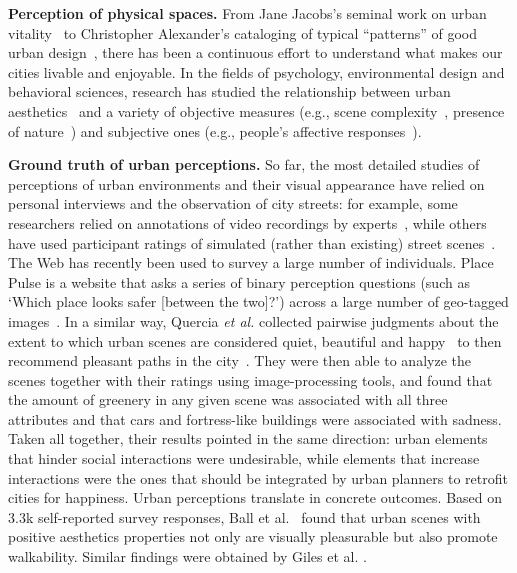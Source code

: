 \vspace{4pt}\noindent
\textbf{Perception of physical spaces.} From Jane Jacobs's seminal work on urban vitality~\cite{jacobs1961death} to Christopher Alexander's cataloging of typical ``patterns'' of good urban design~\cite{alexander1977pattern}, there has been a continuous effort to understand what makes our cities livable and enjoyable.  In the fields of psychology, environmental design and behavioral sciences, research has studied the relationship between urban aesthetics~\cite{real2000classification} and a variety of objective measures  (e.g.,  scene complexity~\cite{kaplan1972rated}, presence of nature~\cite{kaplan1989experience}) and subjective ones (e.g., people's affective responses~\cite{ulrich1983aesthetic}).  


\vspace{4pt}\noindent
\textbf{Ground truth of urban perceptions.} So far, the most detailed studies of perceptions of urban environments and their visual appearance have relied on personal interviews and the observation of city streets: for example, some researchers relied on annotations of video recordings by experts~\cite{sampson04seeing}, while others have used participant ratings of simulated (rather than existing) street scenes~\cite{lindal2012}. The Web has recently been used to survey a large number of individuals. Place Pulse is a website that asks a series of binary perception questions (such as `Which place looks safer [between the two]?') across a large number of geo-tagged images~\cite{salesses2013collaborative}. In a similar way, Quercia \emph{et al.} collected pairwise judgments about the extent to which urban scenes are considered quiet, beautiful and happy~\cite{quercia2014aesthetic} to then recommend pleasant paths in the city~\cite{quercia2014shortest}. They were then able to analyze the scenes together with their ratings using image-processing tools, and found that the amount of greenery in any given scene was associated with all three attributes and that cars and fortress-like buildings were associated with sadness. Taken all together, their results pointed in the same direction: urban elements that hinder social interactions were undesirable, while elements that increase interactions were the ones that should be integrated by urban planners to retrofit cities for happiness. Urban perceptions translate in concrete outcomes. Based on 3.3k self-reported survey responses,  Ball et al.~\cite{ball2001perceived} found that urban scenes with positive aesthetics properties  not only are visually  pleasurable but also promote walkability. Similar findings were obtained by Giles et al. \cite{giles2005increasing}.

